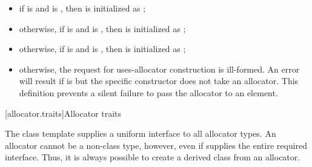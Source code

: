 \begin{itemize}
\item if  is  and
 is , then  is
initialized as ;

\item otherwise, if  is  and
  is
, then  is initialized as ;

\item otherwise, if  is  and
 is , then
 is initialized as ;

\item otherwise, the request for uses-allocator construction is ill-formed. \enternote
An error will result if  is  but the
specific constructor does not take an allocator. This definition prevents a silent
failure to pass the allocator to an element. \exitnote
\end{itemize}

[allocator.traits]{Allocator traits}

\pnum
The class template  supplies a uniform interface to all
allocator types.
An allocator cannot be a non-class type, however, even if 
supplies the entire required interface. \enternote Thus, it is always possible to create
a derived class from an allocator. \exitnote

